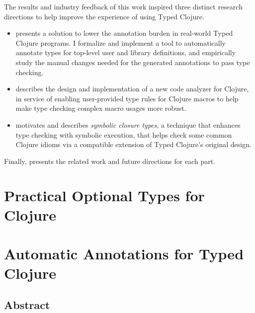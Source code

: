 \documentclass[11pt]{iuthesis}
\begin{document}
The results and industry feedback of this work inspired three distinct research directions
to help improve the experience of using Typed Clojure.

\begin{itemize}
  \item
{} presents a solution to lower the annotation burden in real-world Typed Clojure programs.
I formalize and implement a tool to automatically annotate types for top-level
user and library definitions, and empirically study the manual changes needed for the generated annotations
to pass type checking.
  \item
{} describes the design and implementation of a 
new code analyzer for Clojure, in service of enabling user-provided type rules for Clojure macros
    to help make type checking complex macro usages more robust.
\item {} motivates and describes \emph{symbolic closure types},
      a technique that enhances type checking with symbolic execution, that helps check some
      common Clojure idioms via a compatible extension of Typed Clojure's original design.
\end{itemize}

Finally,  presents the related work and future directions for each part.

\part{Practical Optional Types for Clojure}
\label{part:types}









\part{Automatic Annotations for Typed Clojure}
\label{part:autoann}

\chapter{Abstract}







%

\end{document}
